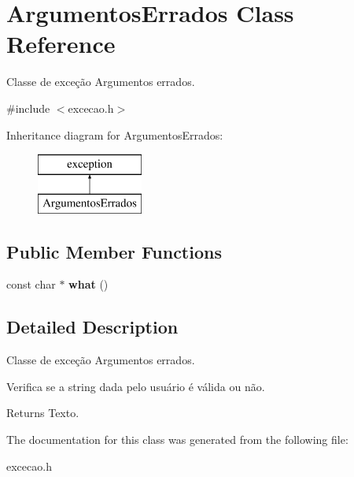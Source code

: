 \hypertarget{classArgumentosErrados}{}\section{Argumentos\+Errados Class Reference}
\label{classArgumentosErrados}


Classe de exceção Argumentos errados.  




{\ttfamily \#include $<$excecao.\+h$>$}

Inheritance diagram for Argumentos\+Errados\+:\begin{figure}[H]
\begin{center}
\leavevmode
\includegraphics[height=2.000000cm]{classArgumentosErrados}
\end{center}
\end{figure}
\subsection*{Public Member Functions}
\begin{DoxyCompactItemize}
\item 
\mbox{\label{classArgumentosErrados_a9d23e10092cd69f8e9fdc94074a24ecf}} 
const char $\ast$ {\bfseries what} ()
\end{DoxyCompactItemize}


\subsection{Detailed Description}
Classe de exceção Argumentos errados. 

Verifica se a string dada pelo usuário é válida ou não. \begin{DoxyReturn}{Returns}
Texto. 
\end{DoxyReturn}


The documentation for this class was generated from the following file\+:\begin{DoxyCompactItemize}
\item 
excecao.\+h\end{DoxyCompactItemize}
